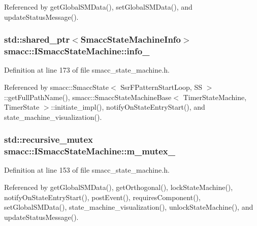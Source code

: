 Referenced by get\+Global\+S\+M\+Data(), set\+Global\+S\+M\+Data(), and update\+Status\+Message().

\subsubsection[{\texorpdfstring{info\+\_\+}{info_}}]{\setlength{\rightskip}{0pt plus 5cm}std\+::shared\+\_\+ptr$<${\bf Smacc\+State\+Machine\+Info}$>$ smacc\+::\+I\+Smacc\+State\+Machine\+::info\+\_\+}\hypertarget{classsmacc_1_1ISmaccStateMachine_a5ec3201cbddab4f062f572fb33021041}{}\label{classsmacc_1_1ISmaccStateMachine_a5ec3201cbddab4f062f572fb33021041}


Definition at line 173 of file smacc\+\_\+state\+\_\+machine.\+h.



Referenced by smacc\+::\+Smacc\+State$<$ Ssr\+F\+Pattern\+Start\+Loop, S\+S $>$\+::get\+Full\+Path\+Name(), smacc\+::\+Smacc\+State\+Machine\+Base$<$ Timer\+State\+Machine, Timer\+State $>$\+::initiate\+\_\+impl(), notify\+On\+State\+Entry\+Start(), and state\+\_\+machine\+\_\+visualization().

\subsubsection[{\texorpdfstring{m\+\_\+mutex\+\_\+}{m_mutex_}}]{\setlength{\rightskip}{0pt plus 5cm}std\+::recursive\+\_\+mutex smacc\+::\+I\+Smacc\+State\+Machine\+::m\+\_\+mutex\+\_\+\hspace{0.3cm}{\ttfamily [private]}}\hypertarget{classsmacc_1_1ISmaccStateMachine_aac785541646e5c517273bf31072505a1}{}\label{classsmacc_1_1ISmaccStateMachine_aac785541646e5c517273bf31072505a1}


Definition at line 153 of file smacc\+\_\+state\+\_\+machine.\+h.



Referenced by get\+Global\+S\+M\+Data(), get\+Orthogonal(), lock\+State\+Machine(), notify\+On\+State\+Entry\+Start(), post\+Event(), requires\+Component(), set\+Global\+S\+M\+Data(), state\+\_\+machine\+\_\+visualization(), unlock\+State\+Machine(), and update\+Status\+Message().

